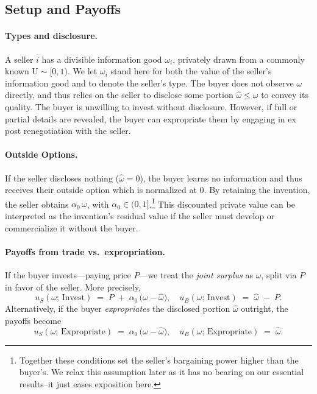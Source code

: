 \documentclass{article}
\begin{document}
\subsection{Setup and Payoffs}
\label{subsec:setup}

\paragraph{Types and disclosure.}
A seller $i$ has a divisible information good $\omega_i$, privately drawn from a commonly known $\mathrm{U} \sim [0,1)$. We let $\omega_i$ stand here for both the value of the seller’s 
information good and to denote the seller’s type. The buyer does not observe $\omega$ directly, and thus relies on the seller to disclose some portion $\hat\omega \le \omega$ to convey its quality. The buyer is unwilling to invest without disclosure. However, if full or partial details are revealed, the buyer can expropriate them by engaging in ex post renegotiation with the seller. 

\paragraph{Outside Options.}
If the seller discloses nothing ($\hat\omega=0$), the buyer learns no information and thus receives their outside option which is normalized at $0$. By retaining the invention, the seller obtains $\alpha_0\,\omega$, with $\alpha_0 \in (0,1]$.\footnote{Together these conditions set the seller's bargaining power higher than the buyer's. We relax this assumption later as it has no bearing on our essential results--it just eases exposition here.} This discounted private value can be interpreted as the invention's residual value if the seller must develop or commercialize it without the buyer.




\paragraph{Payoffs from trade vs.\ expropriation.}
If the buyer invests---paying price $P$---we treat the \emph{joint surplus} as $\hat\omega$,
split via $P$ in favor of the seller.  More precisely,
\begin{equation}\label{eq:payoff_invest}
  u_S(\omega;\,\text{Invest}) \;=\; P \;+\; \alpha_0 \,\bigl(\omega - \hat\omega\bigr),
  \quad
  u_B(\omega;\,\text{Invest}) \;=\; \hat\omega \;-\; P.
\end{equation}
Alternatively, if the buyer \emph{expropriates} the disclosed portion $\hat\omega$ outright,
the payoffs become
\begin{equation}\label{eq:payoff_expropriation}
  u_S(\omega;\,\text{Expropriate}) \;=\; \alpha_0 \,\bigl(\omega - \hat\omega\bigr),
  \quad
  u_B(\omega;\,\text{Expropriate}) \;=\; \hat\omega.
\end{equation}
\end{document}
